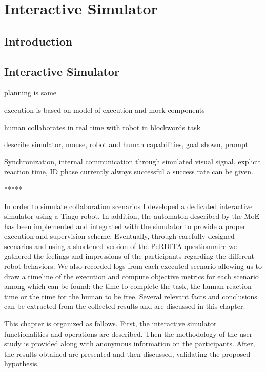 \ifdefined{}
\else
\setcounter{chapter}{4} %
\dominitoc
\faketableofcontents
\fi

\chapter{Interactive Simulator}
\label{chap:5}
\minitoc

\section{Introduction}

\section{Interactive Simulator}
planning is same

execution is based on model of execution and mock components

human collaborates in real time with robot in blockwords task

describe simulator, mouse, robot and human capabilities, goal shown, prompt

Synchronization, internal communication through simulated visual signal, explicit reaction time, ID phase currently always successful a success rate can be given. 

*****


In order to simulate collaboration scenarios I developed a dedicated interactive simulator using a Tiago robot. In addition, the automaton described by the MoE has been implemented and integrated with the simulator to provide a proper execution and supervision scheme. Eventually, through carefully designed scenarios and using a shortened version of the PeRDITA questionnaire we gathered the feelings and impressions of the participants regarding the different robot behaviors. We also recorded logs from each executed scenario allowing us to draw a timeline of the execution and compute objective metrics for each scenario among which can be found: the time to complete the task, the human reaction time or the time for the human to be free. Several relevant facts and conclusions can be extracted from the collected results and are discussed in this chapter.

This chapter is organized as follows. First, the interactive simulator functionalities and operations are described. Then the methodology of the user study is provided along with anonymous information on the participants. After, the results obtained are presented and then discussed, validating the proposed hypothesis.


